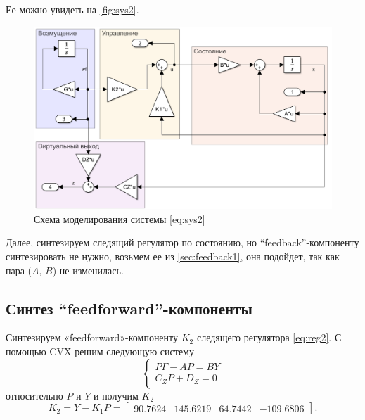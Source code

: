 Ее можно увидеть на \autoref{fig:sys2}.
\begin{figure}[H]
    \centering
    \includegraphics[width=\linewidth]{figs/task2_slx.png}
    \caption{Схема моделирования системы \eqref{eq:sys2}}
    \label{fig:sys2}
\end{figure}
Далее, синтезируем следящий регулятор по состоянию, но
``feedback''-компоненту синтезировать не нужно, возьмем
ее из \autoref{sec:feedback1}, она подойдет, так как
пара ($A$, $B$) не изменилась.

\subsection{Синтез ``feedforward''-компоненты}

Синтезируем «feedforward»-компоненту $K_2$ следящего регулятора \eqref{eq:reg2}.
С помощью CVX решим следующую систему
\begin{equation*}
    \begin{cases}
        P\Gamma-AP=BY\\
        C_ZP+D_Z=0
    \end{cases}
\end{equation*}
относительно $P$ и $Y$ и получим $K_2$
\begin{equation*}
    K_2=Y-K_1P=\begin{bmatrix}
        90.7624&	145.6219&	64.7442&	-109.6806
    \end{bmatrix}.
\end{equation*}

